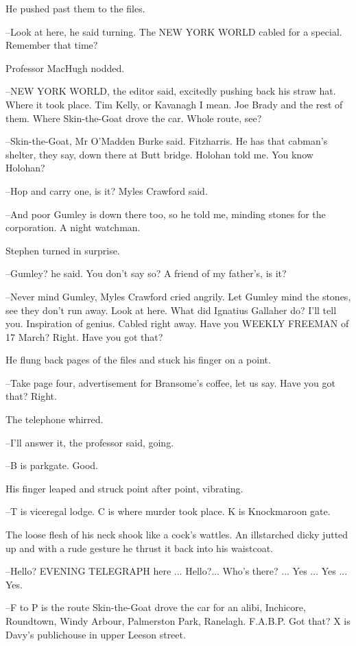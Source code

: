 He pushed past them to the files.

--Look at here, he said turning. The NEW YORK WORLD cabled for a special.
Remember that time?

Professor MacHugh nodded.

--NEW YORK WORLD, the editor said, excitedly pushing back his straw hat.
Where it took place. Tim Kelly, or Kavanagh I mean. Joe Brady and the
rest of them. Where Skin-the-Goat drove the car. Whole route, see?

--Skin-the-Goat, Mr O'Madden Burke said. Fitzharris. He has that
cabman's shelter, they say, down there at Butt bridge. Holohan told me.
You know Holohan?

--Hop and carry one, is it? Myles Crawford said.

--And poor Gumley is down there too, so he told me, minding stones for
the corporation. A night watchman.

Stephen turned in surprise.

--Gumley? he said. You don't say so? A friend of my father's, is it?

--Never mind Gumley, Myles Crawford cried angrily. Let Gumley mind
the stones, see they don't run away. Look at here. What did Ignatius
Gallaher do? I'll tell you. Inspiration of genius. Cabled right away. Have
you WEEKLY FREEMAN of 17 March? Right. Have you got that?

He flung back pages of the files and stuck his finger on a point.

--Take page four, advertisement for Bransome's coffee, let us say. Have
you got that? Right.

The telephone whirred.



--I'll answer it, the professor said, going.

--B is parkgate. Good.

His finger leaped and struck point after point, vibrating.

--T is viceregal lodge. C is where murder took place. K is Knockmaroon
gate.

The loose flesh of his neck shook like a cock's wattles. An illstarched
dicky jutted up and with a rude gesture he thrust it back into his
waistcoat.

--Hello? EVENING TELEGRAPH here ... Hello?... Who's there? ...
Yes ... Yes ... Yes.

--F to P is the route Skin-the-Goat drove the car for an alibi, Inchicore,
Roundtown, Windy Arbour, Palmerston Park, Ranelagh. F.A.B.P. Got that?
X is Davy's publichouse in upper Leeson street.

